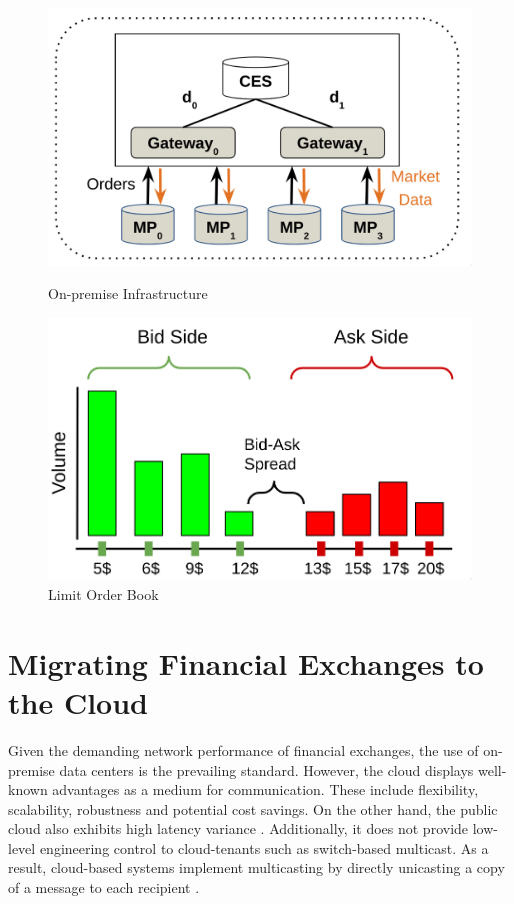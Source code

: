 \begin{figure}[h!]
  \begin{center}
    \begin{minipage}{0.45\textwidth}
      \centering
      \includegraphics[height=0.20\textheight]{./assets/architecture.png}
      \caption{On-premise Infrastructure}
      \label{fig:exchange}
    \end{minipage}
    \hfill
    \begin{minipage}{0.45\textwidth}
      \centering
      \includegraphics[height=0.20\textheight]{./assets/LOB.png}
      \caption{Limit Order Book}
      \label{fig:lob}
    \end{minipage}
  \end{center}
\end{figure}

\section{Migrating Financial Exchanges to the Cloud}
Given the demanding network performance of financial exchanges, the use of 
on-premise data centers is the prevailing standard.
However, the cloud displays well-known advantages as a medium for communication. 
These include flexibility, scalability, robustness and potential cost savings. 
On the other hand, the public cloud also exhibits high latency variance \cite{cloudy}.
Additionally, it does not provide low-level engineering control to cloud-tenants such as switch-based multicast. 
As a result, cloud-based systems implement multicasting by directly unicasting a copy of a message 
to each recipient \cite{nezha, cloudex, octopus, dbo}.


